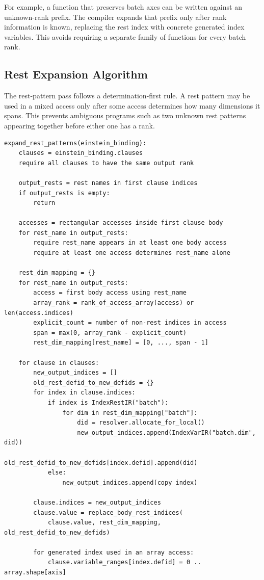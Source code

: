 For example, a function that preserves batch axes can be written against an
unknown-rank prefix. The compiler expands that prefix only after rank
information is known, replacing the rest index with concrete generated index
variables. This avoids requiring a separate family of functions for every batch
rank.

\subsection{Rest Expansion Algorithm}

The rest-pattern pass follows a determination-first rule. A rest pattern may be
used in a mixed access only after some access determines how many dimensions it
spans. This prevents ambiguous programs such as two unknown rest patterns
appearing together before either one has a rank.

\begin{lstlisting}[style=pythoncode,caption={Named rest-index preprocessing.}]
expand_rest_patterns(einstein_binding):
    clauses = einstein_binding.clauses
    require all clauses to have the same output rank

    output_rests = rest names in first clause indices
    if output_rests is empty:
        return

    accesses = rectangular accesses inside first clause body
    for rest_name in output_rests:
        require rest_name appears in at least one body access
        require at least one access determines rest_name alone

    rest_dim_mapping = {}
    for rest_name in output_rests:
        access = first body access using rest_name
        array_rank = rank_of_access_array(access) or len(access.indices)
        explicit_count = number of non-rest indices in access
        span = max(0, array_rank - explicit_count)
        rest_dim_mapping[rest_name] = [0, ..., span - 1]

    for clause in clauses:
        new_output_indices = []
        old_rest_defid_to_new_defids = {}
        for index in clause.indices:
            if index is IndexRestIR("batch"):
                for dim in rest_dim_mapping["batch"]:
                    did = resolver.allocate_for_local()
                    new_output_indices.append(IndexVarIR("batch.dim", did))
                    old_rest_defid_to_new_defids[index.defid].append(did)
            else:
                new_output_indices.append(copy index)

        clause.indices = new_output_indices
        clause.value = replace_body_rest_indices(
            clause.value, rest_dim_mapping, old_rest_defid_to_new_defids)

        for generated index used in an array access:
            clause.variable_ranges[index.defid] = 0 .. array.shape[axis]
\end{lstlisting}

